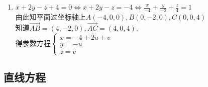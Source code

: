 \documentclass[UTF8]{ctexart}
\begin{document}
\begin{enumerate}
\item $x+2y-z+4=0\Leftrightarrow x+2y-z=-4\Leftrightarrow \displaystyle\frac{x}{-4}+\displaystyle\frac{y}{-2}+\displaystyle\frac{z}{4}=1$\\
由此知平面过坐标轴上$A\left(-4,0,0\right),B\left(0,-2,0\right),C\left(0,0,4\right)$\\
知道$\overrightarrow{AB}=\left(4,-2,0\right),\overrightarrow{AC}=\left(4,0,4\right).$\\
得参数方程$\left\{\begin{array}{l}x=-4+2u+v\\y=-u\\z=v\end{array}\right.$\end{enumerate}

\subsection{直线方程}
\end{document}
